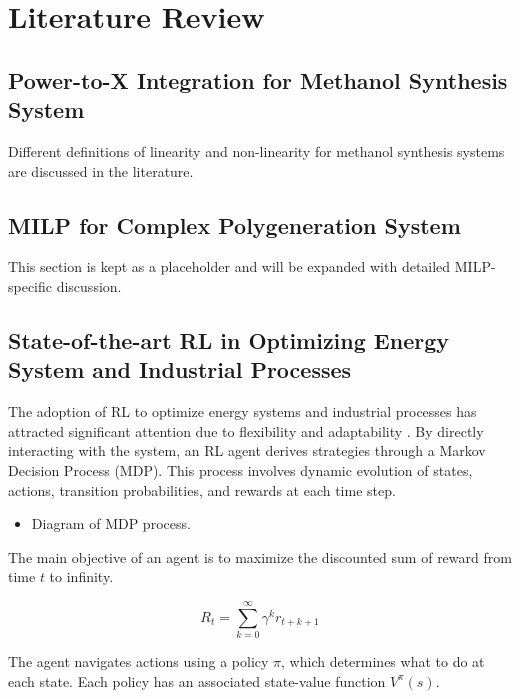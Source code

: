﻿%

\chapter{Literature Review}
\label{ch:literature_review}

\section{Power-to-X Integration for Methanol Synthesis System}

Different definitions of linearity and non-linearity for methanol synthesis systems are discussed in the literature.

\section{MILP for Complex Polygeneration System}

This section is kept as a placeholder and will be expanded with detailed MILP-specific discussion.

\section{State-of-the-art RL in Optimizing Energy System and Industrial Processes}

The adoption of RL to optimize energy systems and industrial processes has attracted significant attention due to flexibility and adaptability \cite{stavrev2024rlTechniques}. By directly interacting with the system, an RL agent derives strategies through a Markov Decision Process (MDP). This process involves dynamic evolution of states, actions, transition probabilities, and rewards at each time step.

\begin{itemize}
\item Diagram of MDP process.
\end{itemize}

The main objective of an agent is to maximize the discounted sum of reward from time $t$ to infinity.

\begin{equation}
\label{eq:discounted_return}
R_t = \sum_{k=0}^{\infty} \gamma^k r_{t+k+1}
\end{equation}

The agent navigates actions using a policy $\pi$, which determines what to do at each state. Each policy has an associated state-value function $V^{\pi}(s)$.

